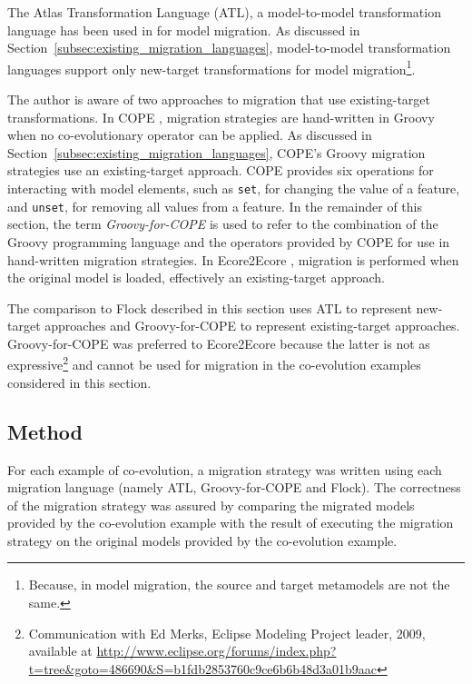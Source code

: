 The Atlas Transformation Language (ATL), a model-to-model transformation language has been used in \cite{cicchetti08automating,garces09managing} for model migration. As discussed in Section~\ref{subsec:existing_migration_languages}, model-to-model transformation languages support only new-target transformations for model migration\footnote{Because, in model migration, the source and target metamodels are not the same.}.

The author is aware of two approaches to migration that use existing-target transformations. In COPE \cite{herrmannsdoerfer09cope}, migration strategies are hand-written in Groovy when no co-evolutionary operator can be applied. As discussed in Section~\ref{subsec:existing_migration_languages}, COPE's Groovy migration strategies use an existing-target approach. COPE provides six operations for interacting with model elements, such as \texttt{set}, for changing the value of a feature, and \texttt{unset}, for removing all values from a feature. In the remainder of this section, the term \emph{Groovy-for-COPE} is used to refer to the combination of the Groovy programming language and the operators provided by COPE for use in hand-written migration strategies. In Ecore2Ecore \cite{hussey06advanced}, migration is performed when the original model is loaded, effectively an existing-target approach.

The comparison to Flock described in this section uses ATL to represent new-target approaches and Groovy-for-COPE to represent existing-target approaches. Groovy-for-COPE was preferred to Ecore2Ecore because the latter is not as expressive\footnote{Communication with Ed Merks, Eclipse Modeling Project leader, 2009, available at \url{http://www.eclipse.org/forums/index.php?t=tree&goto=486690&S=b1fdb2853760c9ce6b6b48d3a01b9aac}} and cannot be used for migration in the co-evolution examples considered in this section.

\subsection{Method}
\label{subsubsec:quantitive_method}
For each example of co-evolution, a migration strategy was written using each migration language (namely ATL, Groovy-for-COPE and Flock). The correctness of the migration strategy was assured by comparing the migrated models provided by the co-evolution example with the result of executing the migration strategy on the original models provided by the co-evolution example.

